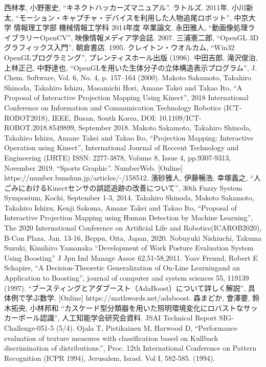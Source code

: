 \begin{thebibliography}{99}
 西林孝, 小野憲史, ``キネクトハッカーズマニュアル''. ラトルズ. 2011年.
 小川新太, ``モーション・キャプチャ・デバイスを利用した人物追尾ロボット'', 中京大学 情報理工学部 機械情報工学科 2014年度 卒業論文.
 永田雅人, ``動画像処理ライブラリーOpenCV'', 映像情報メディア学会誌. 2007.
 三浦憲二郎, ``OpenGL 3Dグラフィックス入門'', 朝倉書店. 1995.
 クレイトン・ウオルカム, ``Win32 OpenGLプログラミング'', プレンティスホール出版 (1996).
 中田吉郎, 滝沢俊治, 上林正己, 中野達也, ``OpenGLを用いた生体分子の立体構造表示プログラム'', J. Chem. Software, Vol. 6, No. 4, p. 157–164 (2000).
 Makoto Sakamoto, Takahiro Shinoda, Takahiro Ishizu, Masamichi Hori, Amane Takei and  Takao Ito, ``A Proposal of Interactive Projection Mapping Using Kinect'', 2018 International Conference on Information and Communication Technology Robotics (ICT-ROBOT2018), IEEE, Busan, South Korea, DOI: 10.1109/ICT-ROBOT.2018.8549899, September 2018.
 Makoto Sakamoto, Takahiro Shinoda, Takahiro Ishizu, Amane Takei and Takao Ito, ``Projection Mapping: Interactive Operation using Kinect'', International Journal of Reccent Technology and Engineering (IJRTE) ISSN: 2277-3878, Volume 8, Issue 4, pp.9307-9313, November 2019. 
 ``Sports Graphic''. NumberWeb. [Online] https://number.bunshun.jp/articles/-/158512.
 濱砂雅人, 伊藤暢浩, 幸塚義之, ``人ごみにおけるKinectセンサの誤認追跡の改善について'', 30th Fuzzy System Symposium, Kochi, September 1-3, 2014.
 Takahiro Shinoda, Makoto Sakamoto, Takahiro Ishizu,  Kenji Sakoma, Amane Takei and Takao Ito, ``Proposal of Interactive Projection Mapping using Human Detection by Machine Learning'', The 2020 International Conference on Artificial Life and Robotics(ICAROB2020), B-Con Plaza, Jan. 13-16, Beppu, Oita, Japan, 2020.
 Nobuyuki Nishiuchi, Takuma Suzuki, Kimihiro Yamanaka ``Development of Work Posture Evaluation System Using Boosting'' J Jpn Ind Manage Assoc 62,51-58,2011.
 Yoav Freund, Robert E Schapire, ``A Decision-Theoretic Generalization of On-Line Learningand an Application to Boosting'', journal of computer and system sciences 55, 119139 (1997).
 ``ブースティングとアダブースト（AdaBoost）について詳しく解説'', 具体例で学ぶ数学. [Online] https://mathwords.net/adaboost. 
 森まどか, 會澤要, 鈴木拓央, 小林邦和 ``カスケード型分類器を用いた照明環境変化にロバストなサッカーボール認識'', 人工知能学会研究会資料. JSAI Technical Report SIG-Challenge-051-5 (5/4).
 Ojala T, Pietikainen M, Harwood D, ``Performance evaluation of texture measures with classification based on Kullback discrimination of distributions.'', Proc. 12th International Conference on Pattern Recognition (ICPR 1994), Jerusalem, Israel. Vol I, 582-585. (1994).


\end{thebibliography}